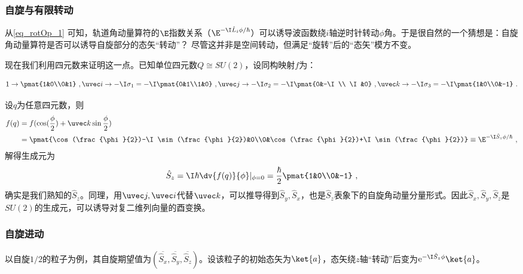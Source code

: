 \subsubsection{自旋与有限转动}

从\autoref{eq_rotOp_1} 可知，轨道角动量算符的$\E$指数关系（$\E^{-\I \hat L_i\phi/\hbar}$）可以诱导波函数绕$i$轴逆时针转动$\phi$角。于是很自然的一个猜想是：自旋角动量算符是否可以诱导自旋部分的态矢“转动”？ 尽管这并非是空间转动，但满足“旋转”后的“态矢”模方不变。

现在我们利用四元数来证明这一点。已知单位四元数$Q\cong SU(2)$，设同构映射$f$为：

\begin{equation}
1\rightarrow\pmat{1&0\\0&1}~,\uvec i\rightarrow-\I\sigma_1=-\I\pmat{0&1\\1&0}~,\uvec j\rightarrow -\I\sigma_2=-\I\pmat{0&-\I\\ \I&0}~,\uvec k\rightarrow -\I\sigma_3=-\I\pmat{1&0\\0&-1}~.
\end{equation}

设$q$为任意四元数，则
\begin{equation}
\begin{aligned}
f(q)&=f(\cos(\frac{\phi}{2})+\uvec k \sin\frac{\phi}{2})\\
&=\pmat{\cos(\frac{\phi}{2})-\I \sin (\frac{\phi}{2})&0\\0&\cos(\frac{\phi}{2})+\I\sin (\frac{\phi}{2})}\equiv\E^{-\I \hat S_z \phi /\hbar}~,
\end{aligned}
\end{equation}
解得生成元为
\begin{equation}
\hat S_z=\I\hbar \dv{f(q)}{\phi}|_{\phi=0}=\frac{\hbar}{2}\pmat{1&0\\0&-1}~,
\end{equation}
确实是我们熟知的$\hat S_z$。同理，用$\uvec j,\uvec i$代替$\uvec k$，可以推导得到$\hat S_y,\hat S_x$，也是$\hat S_z$表象下的自旋角动量分量形式。因此$\hat S_x,\hat S_y,\hat S_z$是$SU(2)$的生成元，可以诱导对复二维列向量的酉变换。
\subsubsection{自旋进动}
以自旋$1/2$的粒子为例，其自旋期望值为$(\overline{\hat S_x},\overline{\hat S_y},\overline{\hat S_z})$。设该粒子的初始态矢为$\ket{a}$，态矢绕$z$轴“转动”后变为$\mathrm e^{- \I\hat S_z\phi}\ket{a}$。

